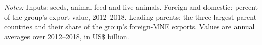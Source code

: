 \begin{table}[htbp]
\centering
\caption{Agricultural exports and multinational shares: inputs and other products}
\label{tab:ap_inputs}
{\small\setlength{\tabcolsep}{4pt}\setlength{\extrarowheight}{1pt}
}

\begin{minipage}{0.95\linewidth}
\notesize
\vspace{0.6em}
\textit{Notes:} Inputs: seeds, animal feed and live animals. Foreign and domestic: percent of the group's export value, 2012--2018. Leading parents: the three largest parent countries and their share of the group's foreign-MNE exports. Values are annual averages over 2012--2018, in US\$ billion.\\
\srcnote
\end{minipage}
\end{table}

